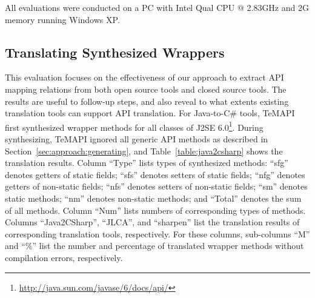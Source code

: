 All evaluations were conducted on a PC with Intel Qual CPU @ 2.83GHz and 2G memory running Windows XP.

\subsection{Translating Synthesized Wrappers}
\label{sec:evaluation:element}
This evaluation focuses on the effectiveness of our approach to extract API mapping relations from both open source tools and closed source tools. The results are useful to follow-up steps, and also reveal to what extents existing translation tools can support API translation. For Java-to-C\# tools, TeMAPI first synthesized wrapper methods for all classes of J2SE 6.0\footnote{\url{http://java.sun.com/javase/6/docs/api/}}. During synthesizing,  TeMAPI ignored all generic API methods as described in Section~\ref{sec:approach:generating}, and Table~\ref{table:java2csharp} shows the translation results. Column ``Type'' lists types of synthesized methods: ``sfg'' denotes getters of static fields; ``sfs'' denotes setters of static fields; ``nfg'' denotes getters of non-static fields; ``nfs'' denotes setters of non-static fields; ``sm'' denotes static methods; ``nm'' denotes non-static methods; and ``Total'' denotes the sum of all methods. Column ``Num'' lists numbers of corresponding types of methods. Columns ``Java2CSharp'', ``JLCA'', and ``sharpen'' list the translation results of corresponding translation tools, respectively. For these columns, sub-columns ``M'' and ``\%'' list the number and percentage of translated wrapper methods without compilation errors, respectively.

